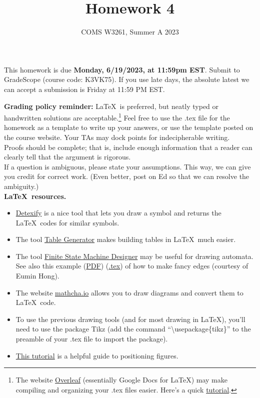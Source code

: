 \documentclass[letterpaper,11pt,twoside]{article}
\title{Homework 4}
\date{COMS W3261, Summer A 2023}
\theoremstyle{plain}
\theoremstyle{definition}
\theoremstyle{remark}
\theoremstyle{restate}
\begin{document}
\maketitle

This homework is due \textbf{Monday, 6/19/2023, at 11:59pm EST}. Submit to GradeScope (course code: K3VK75). If you use late days, the absolute latest we can accept a submission is Friday at 11:59 PM EST.

\textbf{Grading policy reminder:} \LaTeX~is preferred, but neatly typed or handwritten solutions are acceptable.\footnote{The website \href{https://www.overleaf.com/}{Overleaf} (essentially Google Docs for LaTeX) may make compiling and organizing your .tex files easier. Here's a quick \href{https://www.overleaf.com/learn/latex/Learn_LaTeX_in_30_minutes}{tutorial}.} Feel free to use the .tex file for the homework as a template to write up your answers, or use the template posted on the course website. Your TAs may dock points for indecipherable writing.\\

Proofs should be complete; that is, include enough information that a reader can clearly tell that the argument is rigorous. \\

If a question is ambiguous, please state your assumptions. This way, we can give you credit for correct work. (Even better, post on Ed so that we can resolve the ambiguity.) \\

\textbf{\LaTeX~resources.}
\begin{itemize}
    \item \href{https://detexify.kirelabs.org/classify.html}{Detexify} is a nice tool that lets you draw a symbol and returns the \LaTeX~codes for similar symbols. 
    \item The tool \href{https://www.tablesgenerator.com/}{Table Generator} makes building tables in \LaTeX~much easier.
    \item The tool \href{http://madebyevan.com/fsm/}{Finite State Machine Designer} may be useful for drawing automata. See also this example (\href{https://static.us.edusercontent.com/files/HZeTXimODzWeLvHIqsvjL2BG}{PDF}) (\href{https://static.us.edusercontent.com/files/RI3W8tQNvHMWFe9MkXV1KztA}{.tex}) of how to make fancy edges (courtesy of Eumin Hong).
    \item The website \href{https://www.mathcha.io/}{mathcha.io} allows you to draw diagrams and convert them to \LaTeX~code.
    \item To use the previous drawing tools (and for most drawing in \LaTeX), you'll need to use the package Tikz (add the command ``\textbackslash usepackage\{tikz\}'' to the preamble of your .tex file to import the package). 
    \item \href{https://www.overleaf.com/learn/latex/Positioning_of_Figures}{This tutorial} is a helpful guide to positioning figures.
\end{itemize}  
\end{document}
